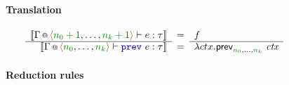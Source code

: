 \begin{figure}[t]
\vspace{1em}
\paragraph{Translation}

\begin{equation*}
\semdeff
  { \coctx{\Gamma}{\alift{\cclrd{n_0+1},\ldots,\cclrd{n_k+1}}} \vdash e : \tau }
  { \coctx{\Gamma}{\alift{\cclrd{n_0},\ldots,\cclrd{n_k}}} \vdash \kvd{prev}~e : \tau }
  {f}
  {\lambda ctx.\ident{prev}_{\cclrd{n_0},\ldots,\cclrd{n_k}}~\ctx }
\end{equation*}

\vspace{1em}
\paragraph{Reduction rules}


\end{figure}
